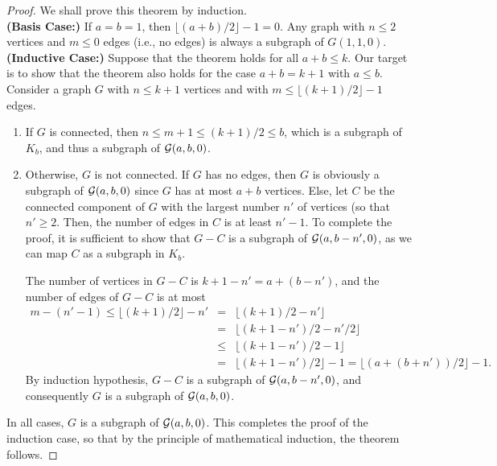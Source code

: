 \documentclass[12pt,a4paper]{article}
\begin{document}
\begin{proof}
We shall prove this theorem by induction.  \\

\noindent
{\bf (Basis Case:)} If $a = b =1$, then $\lfloor (a+b)/2 \rfloor-1 = 0$. Any graph with $n \leq 2$ vertices and $m \leq 0$ edges (i.e., no edges) is always a subgraph of $G(1,1,0)$.
\\

\noindent
{\bf (Inductive Case:)} Suppose that the theorem holds for all $a + b \leq k$.  Our target is to show that the theorem also holds for the case $a + b = k + 1$ with $a \leq b$.   Consider a graph $G$ with  $n \leq k+1$ vertices and with $m \leq \lfloor (k+1)/2 \rfloor -1$ edges. 

\begin{enumerate}
  \item If $G$ is connected, then $n \leq m + 1 \leq (k+1)/2 \leq b$, which is a subgraph of $K_b$, 
           and thus a subgraph of ${\cal G}(a,b,0)$.   

  \item Otherwise, $G$ is not connected.  If $G$ has no edges, then $G$ is obviously a subgraph of ${\cal G}(a,b,0)$ 
          since $G$ has at most $a+b$ vertices.  
          Else, let $C$ be the connected component of $G$ with the largest number $n'$ of vertices (so that $n' \geq 2$.  
          Then, the number of edges in $C$ is at least $n'-1$.  To complete the proof, it is sufficient to show 
          that $G - C$ is a subgraph of ${\cal G}(a, b - n', 0)$, as we can map $C$ as a subgraph in $K_b$.

The number of vertices in $G-C$ is $k+1-n' = a + (b-n')$, and the number of edges of $G-C$ is at most 
\begin{eqnarray*}
m - (n'-1) \leq \lfloor (k+1)/2 \rfloor - n' &=& \lfloor (k+1)/2 - n' \rfloor \\
&=& \lfloor (k+1-n')/2 - n'/2 \rfloor \\
&\leq& \lfloor (k+1-n')/2 - 1 \rfloor \\
&=& \lfloor (k+1-n')/2 \rfloor - 1 = \lfloor (a + (b+n'))/2 \rfloor - 1.
\end{eqnarray*}
By induction hypothesis, $G-C$ is a subgraph of ${\cal G}(a, b-n', 0)$, 
and consequently $G$ is a subgraph of ${\cal G}(a,b,0)$.
\end{enumerate}
In all cases, $G$ is a subgraph of ${\cal G}(a,b,0)$.  This completes the proof of the induction case, so that by the principle of mathematical induction, the theorem follows.
\end{proof}
\end{document}
